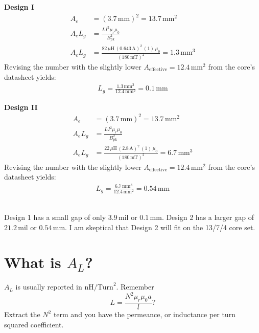 \documentclass{article}
\begin{document}
\noindent %
\begin{minipage}[t]{0.45\linewidth}
    \textbf{Design I}
    \begin{align*}
        A_e &= (3.7 \, \text{mm})^2 = 13.7 \, \text{mm}^2 \\
        A_e L_g &= \frac{L I^2 \mu_r \mu_0}{B_\text{pk}^2} \\
        A_e L_g &= \frac{82 \, \mu\text{H} \, (0.643 \, \text{A})^2 \, (1) \, \mu_0}{(180 \, \text{mT})^2} = 1.3 \, \text{mm}^3
    \end{align*}
    Revising the number with the slightly lower \(A_\text{effective} = 12.4 \, \text{mm}^2\) from the core’s datasheet yields:
    \begin{align*}
    L_g = \frac{1.3 \, \text{mm}^3}{12.4 \, \text{mm}^2} = 0.1 \, \text{mm}
    \end{align*}
\end{minipage}
\begin{minipage}[t]{0.45\linewidth}
    \textbf{Design II}
    \begin{align*}
    A_e &= (3.7 \, \text{mm})^2 = 13.7 \, \text{mm}^2 \\
    A_e L_g &= \frac{L I^2 \mu_r \mu_0}{B_\text{pk}^2} \\
    A_e L_g &= \frac{22 \, \mu\text{H} \, (2.8 \, \text{A})^2 \, (1) \, \mu_0}{(180 \, \text{mT})^2} = 6.7 \, \text{mm}^3
    \end{align*}
    Revising the number with the slightly lower \(A_\text{effective} = 12.4 \, \text{mm}^2\) from the core’s datasheet yields:
    \begin{align*}
    L_g = \frac{6.7 \, \text{mm}^3}{12.4 \, \text{mm}^2} = 0.54 \, \text{mm}
    \end{align*}
\end{minipage} \\

Design 1 has a small gap of only \(3.9 \, \text{mil}\) or \(0.1 \, \text{mm}\).
Design 2 has a larger gap of \(21.2 \, \text{mil}\) or \(0.54 \, \text{mm}\).
I am skeptical that Design 2 will fit on the 13/7/4 core set.

\section{What is \(A_L\)?}
\(A_L\) is usually reported in \(\text{nH/Turn}^2\). Remember 
\[
L = \frac{N^2 \mu_r \mu_0 a}{l}?
\]
Extract the \(N^2\) term and you have the permeance, or inductance per turn squared coefficient.
\end{document}
